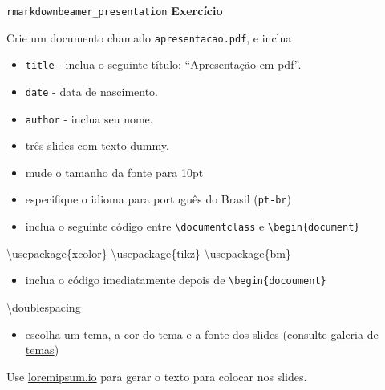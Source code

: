 \documentclass[
  10pt,
  ignorenonframetext,
]{beamer}
\newenvironment{Shaded}{\begin{snugshade}}{\end{snugshade}}
\newcommand{\BuiltInTok}[1]{\textcolor[rgb]{0.00,0.23,0.31}{#1}}
\newcommand{\ExtensionTok}[1]{\textcolor[rgb]{0.00,0.23,0.31}{#1}}
\newcommand{\FunctionTok}[1]{\textcolor[rgb]{0.28,0.35,0.67}{#1}}
\newcommand{\NormalTok}[1]{\textcolor[rgb]{0.00,0.23,0.31}{#1}}
\providecommand{\tightlist}{%
  \setlength{\itemsep}{0pt}\setlength{\parskip}{0pt}}\usepackage{longtable,booktabs,array}
\begin{document}
\begin{frame}[fragile]{\texttt{rmarkdown}\newline \texttt{beamer\_presentation}}
\protect\hypertarget{rmarkdownbeamer_presentation-3}{}
\textbf{Exercício}

Crie um documento chamado \texttt{apresentacao.pdf}, e inclua

\begin{itemize}
\tightlist
\item
  \texttt{title} - inclua o seguinte título: ``Apresentação em pdf''.
\item
  \texttt{date} - data de nascimento.
\item
  \texttt{author} - inclua seu nome.
\item
  três slides com texto dummy.
\item
  mude o tamanho da fonte para 10pt
\item
  especifique o idioma para português do Brasil (\texttt{pt-br})
\item
  inclua o seguinte código entre \texttt{\textbackslash{}documentclass}
  e \texttt{\textbackslash{}begin\{document\}}
\end{itemize}

\begin{Shaded}
\begin{Highlighting}[]
\BuiltInTok{\textbackslash{}usepackage}\NormalTok{\{}\ExtensionTok{xcolor}\NormalTok{\}}
\BuiltInTok{\textbackslash{}usepackage}\NormalTok{\{}\ExtensionTok{tikz}\NormalTok{\}}
\BuiltInTok{\textbackslash{}usepackage}\NormalTok{\{}\ExtensionTok{bm}\NormalTok{\}}
\end{Highlighting}
\end{Shaded}
\end{frame}

\begin{frame}[fragile]
\begin{itemize}
\tightlist
\item
  inclua o código imediatamente depois de
  \texttt{\textbackslash{}begin\{docoument\}}
\end{itemize}

\begin{Shaded}
\begin{Highlighting}[]
\FunctionTok{\textbackslash{}doublespacing}
\end{Highlighting}
\end{Shaded}

\begin{itemize}
\tightlist
\item
  escolha um tema, a cor do tema e a fonte dos slides (consulte
  \href{https://deic.uab.cat/~iblanes/beamer_gallery/index.html}{galeria
  de temas})
\end{itemize}

Use \href{https://loremipsum.io/}{loremipsum.io} para gerar o texto para
colocar nos slides.
\end{frame}
\end{document}

